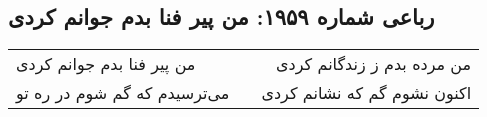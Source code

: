 \begin{center}
\section*{رباعی شماره ۱۹۵۹: من پیر فنا بدم جوانم کردی}
\label{sec:1959}
\begin{longtable}{l p{0.5cm} r}
من پیر فنا بدم جوانم کردی
&&
من مرده بدم ز زندگانم کردی
\\
می‌ترسیدم که گم شوم در ره تو
&&
اکنون نشوم گم که نشانم کردی
\\
\end{longtable}
\end{center}
